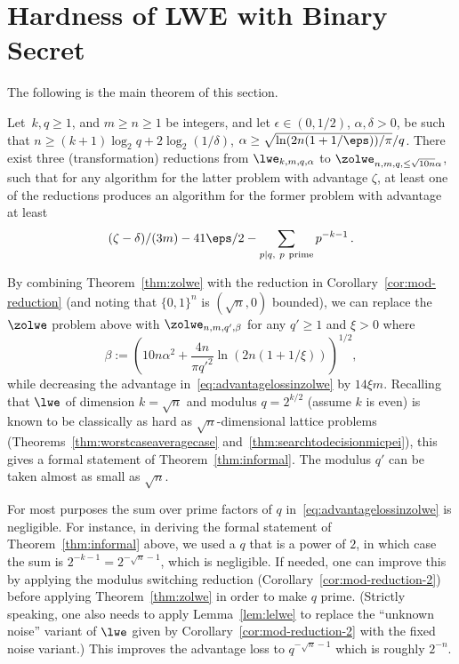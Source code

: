 

\section{Hardness of LWE with Binary Secret}
\label{sec:shortsecret}



The following is the main theorem of this section. 


\begin{theorem}\label{thm:zolwe}
Let~$k, q \ge 1$, and $m \ge n \ge 1$ be integers, and let $\epsilon \in (0,1/2)$, $\alpha, \delta >0$,
be such that $n \ge (k+1) \log_2 q + 2 \log_2 (1/\delta)$,
$\alpha \ge \sqrt{\ln(2n(1+1/\eps))/\pi}/q$.
There exist three (transformation) reductions from $\lwe_{k, m, q, \alpha}$ to $\zolwe_{n, m, q, \le \sqrt{10n} \alpha}$,
such that for any algorithm for the latter problem with advantage $\zeta$, at least one of the reductions produces 
an algorithm for the former problem with advantage at least 
\begin{equation}\label{eq:advantagelossinzolwe}
(\zeta-\delta)/(3m) - 41 \eps/2 - \sum_{p|q,~p~\text{prime}} p^{-k-1}\,.
\end{equation}
\end{theorem}

By combining Theorem~\ref{thm:zolwe} with the reduction in Corollary~\ref{cor:mod-reduction} (and noting that $\{0,1\}^n$ is $(\sqrt{n},0)$ bounded), we can replace the $\zolwe$ problem above with $\zolwe_{n,m,q',\beta}$ for any $q' \ge 1$ and $\xi>0$ where
\[
\beta := \left(10 n \alpha^2 + \frac{4n}{\pi q'^2} \ln(2n(1+1/\xi))\right)^{1/2},
\]
while decreasing the advantage in~\eqref{eq:advantagelossinzolwe} by $14 \xi m$. Recalling that 
$\lwe$ of dimension $k=\sqrt{n}$ and modulus $q=2^{k/2}$ (assume $k$ is even) is known to be 
classically as hard as $\sqrt{n}$-dimensional
lattice problems (Theorems~\ref{thm:worstcaseaveragecase} and~\ref{thm:searchtodecisionmicpei}), 
this gives a formal statement of Theorem~\ref{thm:informal}. The modulus $q'$ can be taken
almost as small as $\sqrt{n}$.

For most purposes the sum over prime factors of $q$ in~\eqref{eq:advantagelossinzolwe} is
negligible. For instance, in deriving the formal statement of Theorem~\ref{thm:informal}
above, we used a $q$ that is a power of $2$, in which case the sum is $2^{-k-1}=2^{-\sqrt{n}-1}$, which
is negligible. If needed, one can improve this by applying the modulus switching reduction (Corollary~\ref{cor:mod-reduction-2})
before applying Theorem~\ref{thm:zolwe} in order to make $q$ prime. (Strictly speaking, one also needs to apply Lemma~\ref{lem:lelwe} to replace the ``unknown noise'' variant of $\lwe$ given by Corollary~\ref{cor:mod-reduction-2} with the fixed noise variant.) This improves the advantage loss
to $q^{-\sqrt{n}-1}$ which is roughly $2^{-n}$. 


